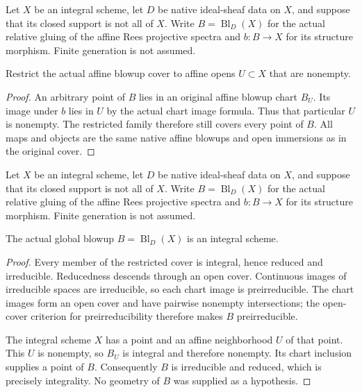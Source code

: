 \endgroup

\begingroup

Let $X$ be an integral scheme, let $D$ be native ideal-sheaf
data on $X$, and suppose that its closed support is not all
of $X$. Write $B=\operatorname{Bl}_D(X)$ for the actual
relative gluing of the affine Rees projective spectra and
$b:B\to X$ for its structure morphism. Finite generation is
not assumed.

\begin{definition}
\label{def:global-blowup-integral-nonempty-cover}
\leanok
Restrict the actual affine blowup cover to affine opens
$U\subset X$ that are nonempty.
\end{definition}
\begin{proof}
An arbitrary point of $B$ lies in an original affine blowup
chart $B_U$. Its image under $b$ lies in $U$ by the actual
chart image formula. Thus that particular $U$ is nonempty.
The restricted family therefore still covers every point
of $B$. All maps and objects are the same native affine
blowups and open immersions as in the original cover.
\end{proof}

\endgroup

\begingroup

Let $X$ be an integral scheme, let $D$ be native ideal-sheaf
data on $X$, and suppose that its closed support is not all
of $X$. Write $B=\operatorname{Bl}_D(X)$ for the actual
relative gluing of the affine Rees projective spectra and
$b:B\to X$ for its structure morphism. Finite generation is
not assumed.

\begin{theorem}
\label{thm:global-native-blowup-integral}
\leanok
The actual global blowup $B=\operatorname{Bl}_D(X)$ is an
integral scheme.
\end{theorem}
\begin{proof}
Every member of the restricted cover is integral, hence
reduced and irreducible. Reducedness descends through an
open cover. Continuous images of irreducible spaces are
irreducible, so each chart image is preirreducible.
The chart images form an open cover and have pairwise
nonempty intersections; the open-cover criterion for
preirreducibility therefore makes $B$ preirreducible.

The integral scheme $X$ has a point and an affine
neighborhood $U$ of that point. This $U$ is nonempty,
so $B_U$ is integral and therefore nonempty. Its chart
inclusion supplies a point of $B$. Consequently $B$ is
irreducible and reduced, which is precisely integrality.
No geometry of $B$ was supplied as a hypothesis.
\end{proof}
\endgroup
